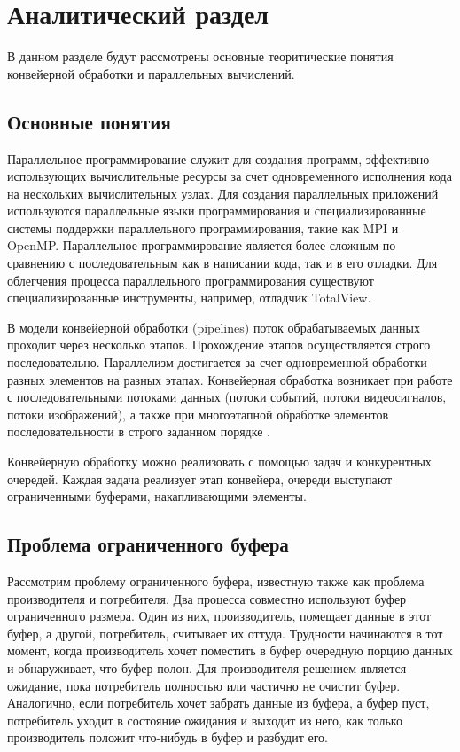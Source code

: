 \chapter{ Аналитический раздел}
\label{cha:analytical}
    В данном разделе будут рассмотрены основные теоритические понятия конвейерной обработки и параллельных вычислений.

    \section{Основные понятия}
        Параллельное программирование служит для создания программ,
        эффективно использующих вычислительные ресурсы за счет одновременного
        исполнения кода на нескольких вычислительных узлах.
        Для создания параллельных приложений используются параллельные языки
        программирования и специализированные системы поддержки параллельного
        программирования, такие как MPI и OpenMP. 
        Параллельное программирование является более сложным по сравнению
        с последовательным как в написании кода, так и в его отладки.
        Для облегчения процесса параллельного программирования существуют
        специализированные инструменты, например, отладчик TotalView.

        В модели конвейерной обработки (pipelines) поток обрабатываемых данных проходит через несколько этапов.
        Прохождение этапов осуществляется строго последовательно. 
        Параллелизм достигается за счет одновременной обработки разных элементов на разных этапах.
        Конвейерная обработка возникает при работе с последовательными потоками данных 
        (потоки событий, потоки видеосигналов, потоки изображений), 
        а также при многоэтапной обработке элементов последовательности в строго заданном порядке \cite{parll2}.

        Конвейерную обработку можно реализовать с помощью задач и конкурентных очередей.
        Каждая задача реализует этап конвейера, очереди выступают ограниченными буферами,
        накапливающими элементы.

    \section{Проблема ограниченного буфера}
        Рассмотрим проблему ограниченного буфера, известную также как проблема производителя и потребителя.
        Два процесса совместно используют буфер ограниченного размера.
        Один из них, производитель, помещает данные в этот буфер,
        а другой, потребитель, считывает их оттуда.
        Трудности начинаются в тот момент, когда производитель хочет поместить
        в буфер очередную порцию данных и обнаруживает, что буфер полон.
        Для производителя решением является ожидание,
        пока потребитель полностью или частично не очистит буфер.
        Аналогично, если потребитель хочет забрать данные из буфера,
        а буфер пуст, потребитель уходит в состояние ожидания и выходит из него,
        как только производитель положит что-нибудь в буфер и разбудит его.

